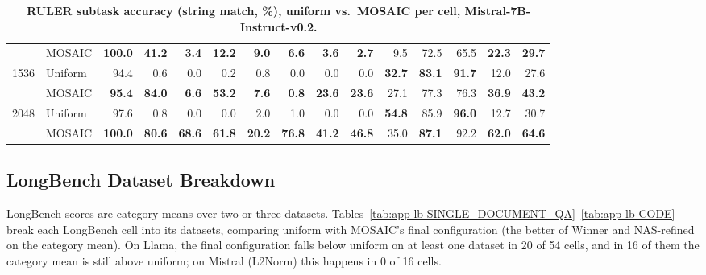 \begin{table}[tp]
\begin{tabular}{@{} c l rrrrrrrrrrrrr @{}}
     & MOSAIC & \textbf{100.0} & \textbf{41.2} & \textbf{3.4} & \textbf{12.2} & \textbf{9.0} & \textbf{6.6} & \textbf{3.6} & \textbf{2.7} & 9.5 & 72.5 & 65.5 & \textbf{22.3} & \textbf{29.7} \\
    \cmidrule(l){1-15}
    \multirow{2}{*}{1536} & Uniform & 94.4 & 0.6 & 0.0 & 0.2 & 0.8 & 0.0 & 0.0 & 0.0 & \textbf{32.7} & \textbf{83.1} & \textbf{91.7} & 12.0 & 27.6 \\
     & MOSAIC & \textbf{95.4} & \textbf{84.0} & \textbf{6.6} & \textbf{53.2} & \textbf{7.6} & \textbf{0.8} & \textbf{23.6} & \textbf{23.6} & 27.1 & 77.3 & 76.3 & \textbf{36.9} & \textbf{43.2} \\
    \cmidrule(l){1-15}
    \multirow{2}{*}{2048} & Uniform & 97.6 & 0.8 & 0.0 & 0.0 & 2.0 & 1.0 & 0.0 & 0.0 & \textbf{54.8} & 85.9 & \textbf{96.0} & 12.7 & 30.7 \\
     & MOSAIC & \textbf{100.0} & \textbf{80.6} & \textbf{68.6} & \textbf{61.8} & \textbf{20.2} & \textbf{76.8} & \textbf{41.2} & \textbf{46.8} & 35.0 & \textbf{87.1} & 92.2 & \textbf{62.0} & \textbf{64.6} \\
    \bottomrule
  \end{tabular}
  \caption{\textbf{RULER subtask accuracy (string match, \%), uniform vs.\ MOSAIC per cell, Mistral-7B-Instruct-v0.2.}}
  \label{tab:app-ruler-mistral}
\end{table}


\subsection{LongBench Dataset Breakdown}
\label{app:dataset-reg}

LongBench scores are category means over two or three datasets. Tables~\ref{tab:app-lb-SINGLE_DOCUMENT_QA}--\ref{tab:app-lb-CODE} break each LongBench cell into its datasets, comparing uniform with MOSAIC's final configuration (the better of Winner and NAS-refined on the category mean). On Llama, the final configuration falls below uniform on at least one dataset in 20 of 54 cells, and in 16 of them the category mean is still above uniform; on Mistral (L2Norm) this happens in 0 of 16 cells.

